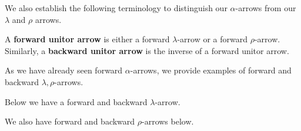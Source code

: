 We also establish the following terminology to distinguish our $\alpha$-arrows 
from our $\lambda$ and $\rho$ arrows.

\begin{definition}
    A \textbf{forward unitor arrow} is either a forward $\lambda$-arrow or a forward $\rho$-arrow.
    Similarly, a  \textbf{backward unitor arrow} is the inverse of a forward unitor arrow.
\end{definition}
 
As we have already seen forward $\alpha$-arrows, 
we provide examples of forward and backward $\lambda, \rho$-arrows.

\begin{example}
    Below we have a forward and backward $\lambda$-arrow.
    \begin{center}
        \hspace{1cm}
    \end{center}
    We also have forward and backward $\rho$-arrows below.
    \begin{center}
        \hspace{1cm}
    \end{center}
\end{example}

